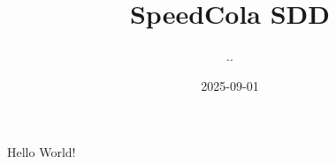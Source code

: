 \documentclass{article}
\title{SpeedCola SDD}
\date{2025-09-01}
\author{..}
\begin{document}
  \maketitle
  \newpage

  Hello World!
\end{document}

